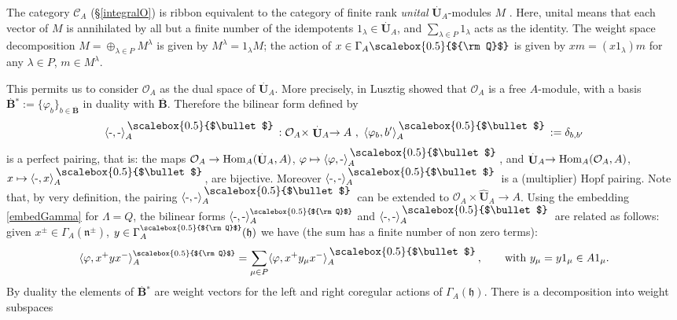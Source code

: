 \documentclass[11pt]{amsart}
\newcommand{\Oo}{\mathcal{O}}
\newcommand{\Q}{{\scalebox{0.5}{${\rm Q}$}}}
\newcommand{\smallbullet}{%
\vcenter{\hbox{\,\scalebox{0.5}{$\bullet$}\,}}
}
\begin{document}
The category $\mathcal{C}_A$ (\S\ref{integralO}) is ribbon equivalent to the category of finite rank {\it unital} $\stackrel{.}{\mathbf{U}}_A$-modules $M$ \cite[\S 23.1.4, \S 31.1.5-9, Th.\,32.1.5]{Lusztig}. Here, unital means that each vector of $M$ is annihilated by all but a finite number of the idempotents $1_\lambda\in \stackrel{.}{\mathbf{U}}_A$, and $\textstyle \sum_{\lambda\in P} 1_\lambda$ acts as the identity. The weight space decomposition $M = \textstyle \oplus_{\lambda \in P} M^\lambda$ is given by $M^\lambda = 1_\lambda M$; the action of $x\in \Gamma_A\Q$ is given by $xm = (x1_\lambda)m$ for any $\lambda\in P$, $m\in M^\lambda$. 


\indent This permits us to consider $\Oo_A$ as the dual space of $\stackrel{.}{\mathbf{U}}_A$. More precisely, in \cite[\S 29.5]{Lusztig} Lusztig showed that $\Oo_A$ is a free $A$-module, with a basis $\stackrel{.}{\mathbf{B}}{\!\!^*}:=\{\varphi_b\}_{b\in \stackrel{.}{\mathbf{B}}}$ in duality with $\stackrel{.}{\mathbf{B}}$. Therefore the bilinear form defined by 
\begin{equation}\label{pairOAnov24}
\langle \text{-},\text{-} \rangle_A^{\smallbullet}:{\mathcal O}_A\times \stackrel{.}{\mathbf{U}}_A\to A\ ,\ \langle \varphi_b,b'\rangle_A^{\smallbullet}:=\delta_{b,b'}
\end{equation}
is a perfect pairing, that is: the maps $\Oo_A\to {\rm Hom}_A(\stackrel{.}{\mathbf{U}}_A,A)$, $\varphi\mapsto \langle \varphi,\text{-} \rangle_A^{\smallbullet}$, and $\stackrel{.}{\mathbf{U}}_A \to {\rm Hom}_A(\Oo_A,A)$, $x\mapsto \langle \text{-},x \rangle_A^{\smallbullet}$, are bijective. Moreover $\langle \text{-},\text{-} \rangle_A^{\smallbullet}$ is a (multiplier) Hopf pairing. Note that, by very definition, the pairing $\langle \text{-},\text{-} \rangle_A^{\smallbullet}$ can be extended to $\mathcal{O}_A \times \hat{\mathbf{U}}_A \to A$. Using the embedding \eqref{embedGamma} for $\Lambda = Q$, the bilinear forms $\langle \text{-},\text{-} \rangle_A^\Q$ and $\langle \text{-},\text{-} \rangle_A^{\smallbullet}$ are related as follows: given $x^{\pm}\in{\Gamma_A}(\mathfrak{n}^{\pm})$, $y\in \Gamma_A^\Q(\mathfrak{h})$ we have (the sum has a finite number of non zero terms):
\begin{equation}\label{relpairingdotA}
\langle \varphi , x^+ y x^-\rangle_{A}^\Q=\sum_{\mu\in P}\langle \varphi , x^+ y_\mu x^- \rangle_A^{\smallbullet}, \qquad \text{with } y_{\mu} = y1_{\mu} \in A 1_{\mu}.
\end{equation}
By duality the elements of $\stackrel{.}{\mathbf{B}}{\!\!^*}$ are weight vectors for the left and right coregular actions of $\Gamma_A(\mathfrak{h})$. There is a decomposition into weight subspaces 
\end{document}
